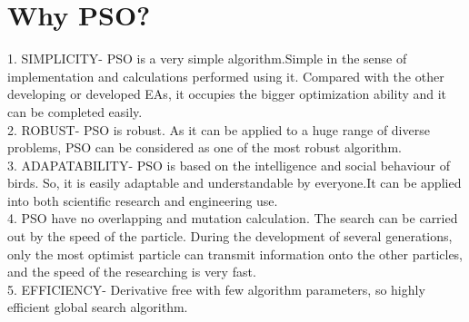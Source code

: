 \section{Why PSO?}
1. SIMPLICITY- PSO is a very simple algorithm.Simple in the sense of implementation and calculations performed using it. Compared with the other developing or developed EAs, it occupies the bigger optimization ability and it can be completed easily.\\
2. ROBUST- PSO is robust. As it can be applied to a huge range of diverse problems, PSO can be considered as one of the most robust algorithm.\\
3. ADAPATABILITY- PSO is based on the intelligence and social behaviour of birds. So, it is easily adaptable and understandable by everyone.It can be applied into both scientific research and engineering use.\\
4. PSO have no overlapping and mutation calculation. The search can be carried out by the speed of the particle. During the development of several generations, only the most optimist particle can transmit information onto the other particles, and the speed of the researching is very fast.\\
5. EFFICIENCY- Derivative free with few algorithm parameters, so highly efficient global search algorithm.\\
